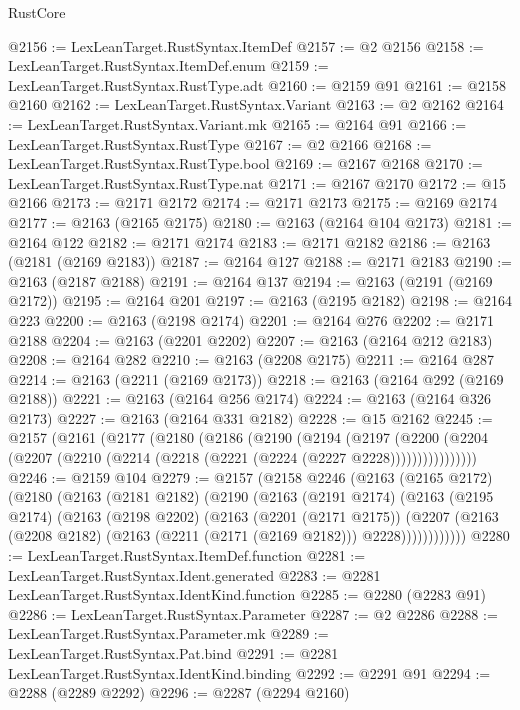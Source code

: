 \begin{lexlean}{RustCore}
\begin{coremodule}
@2156 := LexLeanTarget.RustSyntax.ItemDef
@2157 := @2 @2156
@2158 := LexLeanTarget.RustSyntax.ItemDef.enum
@2159 := LexLeanTarget.RustSyntax.RustType.adt
@2160 := @2159 @91
@2161 := @2158 @2160
@2162 := LexLeanTarget.RustSyntax.Variant
@2163 := @2 @2162
@2164 := LexLeanTarget.RustSyntax.Variant.mk
@2165 := @2164 @91
@2166 := LexLeanTarget.RustSyntax.RustType
@2167 := @2 @2166
@2168 := LexLeanTarget.RustSyntax.RustType.bool
@2169 := @2167 @2168
@2170 := LexLeanTarget.RustSyntax.RustType.nat
@2171 := @2167 @2170
@2172 := @15 @2166
@2173 := @2171 @2172
@2174 := @2171 @2173
@2175 := @2169 @2174
@2177 := @2163 (@2165 @2175)
@2180 := @2163 (@2164 @104 @2173)
@2181 := @2164 @122
@2182 := @2171 @2174
@2183 := @2171 @2182
@2186 := @2163 (@2181 (@2169 @2183))
@2187 := @2164 @127
@2188 := @2171 @2183
@2190 := @2163 (@2187 @2188)
@2191 := @2164 @137
@2194 := @2163 (@2191 (@2169 @2172))
@2195 := @2164 @201
@2197 := @2163 (@2195 @2182)
@2198 := @2164 @223
@2200 := @2163 (@2198 @2174)
@2201 := @2164 @276
@2202 := @2171 @2188
@2204 := @2163 (@2201 @2202)
@2207 := @2163 (@2164 @212 @2183)
@2208 := @2164 @282
@2210 := @2163 (@2208 @2175)
@2211 := @2164 @287
@2214 := @2163 (@2211 (@2169 @2173))
@2218 := @2163 (@2164 @292 (@2169 @2188))
@2221 := @2163 (@2164 @256 @2174)
@2224 := @2163 (@2164 @326 @2173)
@2227 := @2163 (@2164 @331 @2182)
@2228 := @15 @2162
@2245 := @2157
    (@2161
      (@2177
        (@2180
          (@2186
            (@2190
              (@2194
                (@2197
                  (@2200
                    (@2204 (@2207 (@2210 (@2214 (@2218 (@2221 (@2224 (@2227 @2228))))))))))))))))
@2246 := @2159 @104
@2279 := @2157
    (@2158
      @2246
      (@2163
        (@2165 @2172)
        (@2180
          (@2163
            (@2181 @2182)
            (@2190
              (@2163
                (@2191 @2174)
                (@2163
                  (@2195 @2174)
                  (@2163
                    (@2198 @2202)
                    (@2163
                      (@2201 (@2171 @2175))
                      (@2207
                        (@2163 (@2208 @2182) (@2163 (@2211 (@2171 (@2169 @2182))) @2228))))))))))))
@2280 := LexLeanTarget.RustSyntax.ItemDef.function
@2281 := LexLeanTarget.RustSyntax.Ident.generated
@2283 := @2281 LexLeanTarget.RustSyntax.IdentKind.function
@2285 := @2280 (@2283 @91)
@2286 := LexLeanTarget.RustSyntax.Parameter
@2287 := @2 @2286
@2288 := LexLeanTarget.RustSyntax.Parameter.mk
@2289 := LexLeanTarget.RustSyntax.Pat.bind
@2291 := @2281 LexLeanTarget.RustSyntax.IdentKind.binding
@2292 := @2291 @91
@2294 := @2288 (@2289 @2292)
@2296 := @2287 (@2294 @2160)

\end{coremodule}
\end{lexlean}
